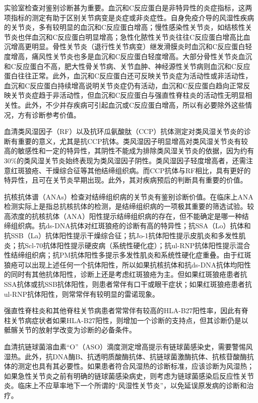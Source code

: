 实验室检查对鉴别诊断甚为重要。血沉和C反应蛋白是非特异性的炎症指标，这两项指标的测定有助于区别关节病变是炎症或非炎症性。自身免疫介导的风湿性疾病的关节炎，多有较明显的血沉和C反应蛋白增高；慢性感染性关节炎，如结核性关节炎也伴血沉和C反应蛋白明显增高；急性化脓性关节炎往往C反应蛋白增高比血沉增高更明显。骨性关节炎（退行性关节病变）继发滑膜炎时血沉和C反应蛋白轻度增高，痛风性关节炎也多是血沉和C反应蛋白轻度增高。大部分骨性关节炎血沉和C反应蛋白不高，肥大性骨关节病、关节血肿、神经源性关节病则血沉和C反应蛋白往往正常。此外，血沉和C反应蛋白还可反映关节炎症为活动性或非活动性，血沉和C反应蛋白持续增高说明关节炎症仍有活动，血沉和C反应蛋白趋向正常反映关节炎症趋于非活动性，但血沉和C反应蛋白与强直性脊柱炎的活动性无明显相关性。此外，不少并存疾病可引起血沉或C反应蛋白增高，所以有必要除外这些情况，方有诊断参考价值。

血清类风湿因子（RF）以及抗环瓜氨酸肽（CCP）抗体测定对类风湿关节炎的诊断有重要的意义，尤其是抗CCP抗体。类风湿因子明显增高对类风湿关节炎有较高的敏感性和一定的特异性，其阴性不能成为排除类风湿关节炎的依据，因为约有30\%的类风湿关节炎始终表现为类风湿因子阴性。类风湿因子轻度增高者，还需注意红斑狼疮、干燥综合征等其他结缔组织病。而CCP抗体与RF相比，具有更好的特异性，且可在关节炎早期出现。此外，其对疾病预后的判断具有重要的价值。

抗核抗体谱（ANAs）检查对结缔组织病的关节炎有鉴别诊断价值。在临床上ANA检测实际上是指总抗核抗体的检测，是结缔组织病的一项极其重要的筛选试验。较高浓度的抗核抗体（ANA）阳性提示结缔组织病的存在，但不能确定是哪一种结缔组织病。抗ds-DNA抗体对红斑狼疮的诊断有高的特异性；抗SSA（Lo）抗体和抗SSB（La）抗体阳性提示干燥综合征；抗Jo-1抗体阳性提示皮肌炎和多发性肌炎；抗Scl-70抗体阳性提示硬皮病（系统性硬化症）；抗ul-RNP抗体阳性提示混合性结缔组织病；抗PM抗体阳性多提示多发性肌炎和系统性硬化症重叠。由于红斑狼疮可以出现上述任何一个抗体阳性，所以如果抗核抗体和抗ds-DNA抗体均阳性的同时有其他抗体阳性，诊断上还是考虑红斑狼疮为主。但如果红斑狼疮患者抗SSA抗体或抗SSB抗体阳性，则患者常伴有口干或眼干症状；如果红斑狼疮患者抗ul-RNP抗体阳性，则常常伴有较明显的雷诺现象。

强直性脊柱炎和其他脊柱关节病患者常常伴有较高的HLA-B27阳性率，因此有脊柱关节病症状者如果HLA-B27阳性，则增加一个诊断的支持点，但其诊断仍是以骶髂关节的放射学改变为诊断的必备条件。

血清抗链球菌溶血素“O”（ASO）滴度测定增高提示有链球菌感染史，需要警惕风湿热。此外，抗DNA酶B、抗透明质酸酶抗体、抗链球菌激酶抗体、抗核苷酸酶抗体的测定也具有其必要性。如果患者符合风湿热的诊断标准，应该诊断为风湿热；如果急性关节炎之前有明确的链球菌感染病史，则考虑为链球菌感染后反应性关节炎。临床上不应草率地下一个所谓的“风湿性关节炎”，以免延误原发病的诊断和治疗。

